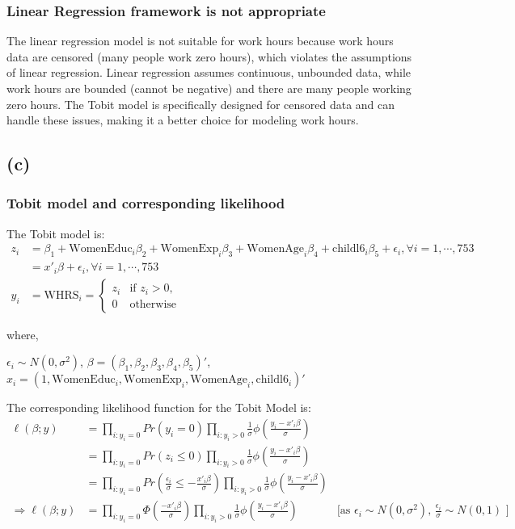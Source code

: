\documentclass[a4paper]{article}
\begin{document}
\subsubsection*{Linear Regression framework is not appropriate }
The linear regression model is not suitable for work hours because work hours data are censored (many people work zero hours), which violates the assumptions of linear regression. Linear regression assumes continuous, unbounded data, while work hours are bounded (cannot be negative) and there are many people working zero hours. The Tobit model is specifically designed for censored data and can handle these issues, making it a better choice for modeling work hours.


\subsection*{(c)}

\subsubsection*{Tobit model and corresponding likelihood}

The Tobit model is:
\begin{align*}
    z_{i} &= \beta_{1} + \text{WomenEduc}_{i}\beta_{2} + \text{WomenExp}_{i}\beta_{3} + \text{WomenAge}_{i}\beta_{4} + \text{childl6}_{i}\beta_{5} + \epsilon_{i}, \forall i = 1, \cdots, 753  \\
    &= x'_{i} \beta + \epsilon_{i}, \forall i = 1, \cdots, 753 \\
    y_{i} &= \text{WHRS}_{i} =
\begin{cases} 
z_{i} & \text{if } z_{i} > 0, \\
0 & \text{otherwise}
\end{cases}
\end{align*}

where, 

$\epsilon_{i} \sim N(0, \sigma^2)$, $\beta = (\beta_{1}, \beta_{2},\beta_{3},\beta_{4},\beta_{5})'$,
$x_{i} = (1,\text{WomenEduc}_{i},\text{WomenExp}_{i}, \text{WomenAge}_{i}, \text{childl6}_i)'$
\vspace{4pt}

The corresponding likelihood function for the Tobit Model is:
\begin{align*}
    \ell(\beta;y) &= \prod_{i : y_i = 0} Pr(y_i = 0) \prod_{i : y_i > 0} \frac{1}{\sigma}\phi(\frac{y_i - x'_i\beta}{\sigma}) \\
    &= \prod_{i : y_i = 0} Pr(z_i \leq 0) \prod_{i : y_i > 0} \frac{1}{\sigma} \phi(\frac{y_i - x'_i\beta}{\sigma}) \\
    &= \prod_{i : y_i = 0} Pr(\frac{\epsilon_i}{\sigma} \leq -\frac{x'_i\beta}{\sigma}) \prod_{i : y_i > 0} \frac{1}{\sigma} \phi(\frac{y_i - x'_i\beta}{\sigma}) \\
    \Rightarrow \ell(\beta;y) &= \prod_{i : y_i = 0} \Phi (\frac{-x'_i\beta}{\sigma}) \prod_{i : y_i > 0} \frac{1}{\sigma} \phi(\frac{y_i - x'_i\beta}{\sigma}) & \text{[as $\epsilon_i \sim  N(0,\sigma^2)$, $\frac{\epsilon_i}{\sigma} \sim N(0,1)$ ]}
\end{align*}
\end{document}
